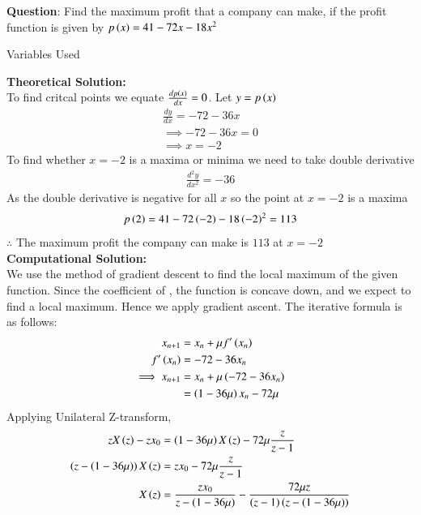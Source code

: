 \documentclass[journal]{IEEEtran}
\begin{document}
\textbf{Question}:\newline
Find the maximum profit that a company can make, if the profit function is given by $p\left(x\right)=41-72x-18x^2$
\newline
\begin{table}[h!]    
  \centering
  
  \caption{Variables Used}
  \label{tab1.1.2.2}
\end{table}
\newline
\textbf{Theoretical Solution:}\\
To find critcal points we equate $\frac{dp\left(x\right)}{dx}=0$. Let $y=p\left(x\right)$
\begin{align}
    \frac{dy}{dx}=-72-36x\\
    \implies -72-36x=0\\
    \implies x=-2
\end{align}
To find whether $x=-2$ is a maxima or minima we need to take double derivative
\begin{align}
    \frac{d^2y}{dx^2}=-36
\end{align}
As the double derivative is negative for all $x$ so the point at $x=-2$ is a maxima\\
\begin{align}
    p\left(2\right)=41-72\left(-2\right)-18\left(-2\right)^2=113
\end{align}
$\therefore$ The maximum profit the company can make is $113$ at $x=-2$\\
\textbf{Computational Solution:}\\
We use the method of gradient descent to find the local maximum of the given function. Since the coefficient of , the function is concave down, and we expect to find a local maximum. Hence we apply gradient ascent. The iterative formula  is as follows:
\begin{align}
    x_{n+1}&=x_n+\mu f^{\prime}\left(x_n\right)\\
    f^\prime\left(x_n\right)&=-72-36x_n\\
    \implies x_{n+1}&=x_n+\mu\left(-72-36x_n\right)\\
    &=\left(1-36\mu\right)x_n-72\mu
\end{align}
Applying Unilateral Z-transform,
\begin{align}
    zX\left(z\right) - zx_0 &= \left(1 - 36\mu\right)X\left(z\right) - 72\mu \frac{z}{z-1} \\
    \left(z - \left(1 - 36\mu\right)\right)X\left(z\right) &= zx_0 - 72\mu \frac{z}{z-1} \\
    X\left(z\right) &= \frac{zx_0}{z - \left(1 - 36\mu\right)} - \frac{72\mu z}{\left(z-1\right)\left(z - \left(1 - 36\mu\right)\right)}
\end{align}
\end{document}
